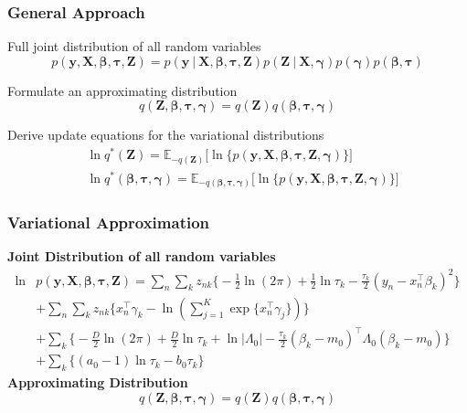\documentclass{beamer}
\newcommand\given[1][]{\:#1\vert\:}
\newcommand{\transpose}[1]{#1^{\intercal}}
\newcommand{\nsum}{\sum_{n}}
\newcommand{\ksum}{\sum_{k}}
\newcommand{\boldbeta}{\boldsymbol\beta}
\newcommand{\boldgamma}{\boldsymbol\gamma}
\newcommand{\boldtau}{\boldsymbol\tau}
\newcommand{\sumexp}{\sum_{j=1}^{K} \exp \{ \transpose{x_n} \gamma_j \}}
\newcommand{\E}{\mathbb{E}}
\newcommand{\pr}[1]{p \left( #1 \right)}
\begin{document}
\begin{frame}
\frametitle{General Approach}
\begin{block}{Full joint distribution of all random variables}
$$ \pr{\mathbf{y}, \mathbf{X}, \boldbeta, \boldtau, \mathbf{Z}} = \pr{\mathbf{y} \given \mathbf{X}, \boldsymbol\beta, \boldsymbol{\tau}, \mathbf{Z}}\pr{\mathbf{Z}\given \mathbf{X}, \boldgamma}\pr{\boldgamma}\pr{\boldbeta, \boldtau}$$
\end{block}

\begin{block}{Formulate an approximating distribution}
$$q \left( \mathbf{Z}, \boldbeta, \boldtau, \boldgamma \right) = q(\mathbf{Z}) q(\boldbeta, \boldtau, \boldgamma)$$
\end{block}

\begin{block}{Derive update equations for the variational distributions}
\begin{align*}
	& \ln q^{*}(\mathbf{Z}) = \E_{-q(\mathbf{Z})} \Big[ \ln \big\{ \pr{\mathbf{y}, \mathbf{X}, \boldbeta, \boldtau, \mathbf{Z}, \boldgamma} \big\} \Big] \\
	& \ln q^{*}(\boldbeta, \boldtau, \boldgamma) = \E_{-q(\mathbf{\boldbeta, \boldtau, \boldgamma})}\Big[ \ln \big\{ \pr{\mathbf{y}, \mathbf{X}, \boldbeta, \boldtau, \mathbf{Z}, \boldgamma} \big\} \Big]
\end{align*}
\end{block}
\end{frame}



\begin{frame}
\frametitle{Variational Approximation}
\textbf{Joint Distribution of all random variables}
\begin{equation*} \label{eq:joint}
\begin{split}
	\ln &\pr{\mathbf{y}, \mathbf{X}, \boldbeta, \boldtau, \mathbf{Z}} = \nsum \ksum z_{nk}\bigg\{ -\frac{1}{2}\ln(2\pi) + \frac{1}{2} \ln \tau_k - \frac{\tau_k}{2} \left( y_n - \transpose{x_n}\beta_k\right)^2 \bigg\} \\
	& + \nsum \ksum z_{nk} \bigg\{ \transpose{x_n} \gamma_k - \ln\left( \sumexp \right) \bigg\} \\
	& + \ksum  \bigg\{ -\frac{D}{2} \ln (2\pi) + \frac{D}{2} \ln \tau_k + \ln | \Lambda_0| - \frac{\tau_k}{2}\transpose{(\beta_k - m_0)} \Lambda_0 (\beta_k - m_0)\bigg\} \\
	& + \ksum \bigg\{ (a_0 - 1) \ln \tau_k - b_0 \tau_k \bigg\}
\end{split}
\end{equation*}
\textbf{Approximating Distribution}
\begin{equation} \label{eq:q}
	q \left( \mathbf{Z}, \boldbeta, \boldtau, \boldgamma \right) = q(\mathbf{Z}) q(\boldbeta, \boldtau, \boldgamma)
\end{equation}

\end{frame}
\end{document}

